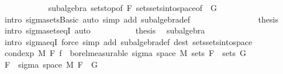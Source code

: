 \begin{isabellebody}
\ \ \ \ \ \ \ \ \ \ \isamarkupfalse%
\ subalgebra\ sets{\isachardot}{\kern0pt}top{\isacharbrackleft}{\kern0pt}of\ F{\isacharbrackright}{\kern0pt}\ sets{\isachardot}{\kern0pt}sets{\isacharunderscore}{\kern0pt}into{\isacharunderscore}{\kern0pt}space{\isacharbrackleft}{\kern0pt}of\ {\isacharunderscore}{\kern0pt}\ G{\isacharbrackright}{\kern0pt}\ \isanewline
\ \ \ \ \ \ \ \ \ \ \isamarkupfalse%
\ {\isacharparenleft}{\kern0pt}intro\ sigma{\isacharunderscore}{\kern0pt}sets{\isachardot}{\kern0pt}Basic{\isacharcomma}{\kern0pt}\ auto\ simp\ add{\isacharcolon}{\kern0pt}\ subalgebra{\isacharunderscore}{\kern0pt}def{\isacharparenright}{\kern0pt}\isanewline
\ \ \ \ \ \ \isacommand{{\isacharbraceright}{\kern0pt}}\isamarkupfalse%
\isanewline
\ \ \ \ \ \ \isamarkupfalse%
\ \isamarkupfalse%
\ {\isacharquery}{\kern0pt}thesis\ \isamarkupfalse%
\ {\isacharparenleft}{\kern0pt}intro\ sigma{\isacharunderscore}{\kern0pt}sets{\isacharunderscore}{\kern0pt}eqI{\isacharparenright}{\kern0pt}\ auto\isanewline
\ \ \ \ \isamarkupfalse%
\isanewline
\ \ \ \ \isamarkupfalse%
\ {\isacharquery}{\kern0pt}thesis\ \isamarkupfalse%
\ subalgebra\ \isamarkupfalse%
\ {\isacharparenleft}{\kern0pt}intro\ sigma{\isacharunderscore}{\kern0pt}eqI{\isacharparenright}{\kern0pt}\ {\isacharparenleft}{\kern0pt}force\ simp\ add{\isacharcolon}{\kern0pt}\ subalgebra{\isacharunderscore}{\kern0pt}def\ dest{\isacharcolon}{\kern0pt}\ sets{\isachardot}{\kern0pt}sets{\isacharunderscore}{\kern0pt}into{\isacharunderscore}{\kern0pt}space{\isacharparenright}{\kern0pt}{\isacharplus}{\kern0pt}\isanewline
\ \ \isamarkupfalse%
\isanewline
\ \ \isamarkupfalse%
\ \isamarkupfalse%
\ {\isachardoublequoteopen}{\isacharparenleft}{\kern0pt}cond{\isacharunderscore}{\kern0pt}exp\ M\ F\ f{\isacharparenright}{\kern0pt}\ {\isasymin}\ borel{\isacharunderscore}{\kern0pt}measurable\ {\isacharparenleft}{\kern0pt}sigma\ {\isacharparenleft}{\kern0pt}space\ M{\isacharparenright}{\kern0pt}\ {\isacharparenleft}{\kern0pt}sets\ F\ {\isasymunion}\ sets\ G{\isacharparenright}{\kern0pt}{\isacharparenright}{\kern0pt}{\isachardoublequoteclose}\isanewline
\ \ \isamarkupfalse%
\ {\isacharminus}{\kern0pt}\isanewline
\ \ \ \ \isamarkupfalse%
\ {\isachardoublequoteopen}F\ {\isasymsubseteq}\ sigma\ {\isacharparenleft}{\kern0pt}space\ M{\isacharparenright}{\kern0pt}\ {\isacharparenleft}{\kern0pt}F\ {\isasymunion}\ G{\isacharparenright}{\kern0pt}{\isachardoublequoteclose}\ \isamarkupfalse%

\end{isabellebody}
